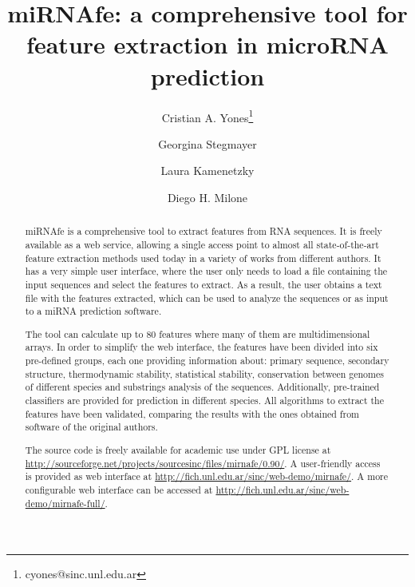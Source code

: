 \documentclass{article}
\begin{document}
\setcounter{page}{47}

\title{miRNAfe: a comprehensive tool for feature extraction in microRNA prediction}
\date{}
\author[1]{Cristian A. Yones\thanks{cyones@sinc.unl.edu.ar}}
\author[1]{Georgina Stegmayer}
\author[2]{Laura Kamenetzky}
\author[1]{Diego H. Milone}

\maketitle

\begin{abstract}
miRNAfe is a comprehensive tool to extract features from RNA sequences. It is freely available as a web service, allowing a single access point to almost all
state-of-the-art feature extraction methods used today in a variety of works from different authors. It has a very simple user interface, where the user only
needs to load a file containing the input sequences and select the features to extract. As a result, the user obtains a text file with the features extracted,
which can be used to analyze the sequences or as input to a miRNA prediction software.

The tool can calculate up to 80 features where many of them are multidimensional arrays. In order to simplify the web interface, the features have been divided
into six pre-defined groups, each one providing information about: primary sequence, secondary structure, thermodynamic stability, statistical stability,
conservation between genomes of different species and  substrings analysis of the sequences. Additionally, pre-trained classifiers are provided for prediction
in different species. All algorithms to extract the features have been validated, comparing the results with the ones obtained from software of the original
authors.

The source code is freely available for academic use under GPL license at \url{http://sourceforge.net/projects/sourcesinc/files/mirnafe/0.90/}. A user-friendly
access is provided as web interface at \url{http://fich.unl.edu.ar/sinc/web-demo/mirnafe/}. A more configurable web interface can be accessed at
\url{http://fich.unl.edu.ar/sinc/web-demo/mirnafe-full/}.
\end{abstract}
\end{document}
